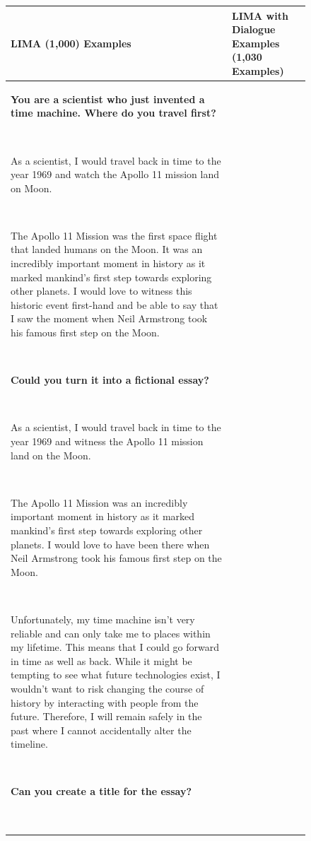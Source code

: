 \documentclass{article}
\begin{document}
 \begin{figure}[p]
    \scriptsize
    \centering
    \begin{tabular}{@{}p{}p{}@{}}
    \toprule
    \textbf{LIMA (1,000) Examples} & \textbf{LIMA with Dialogue Examples (1,030 Examples)} \\
    \midrule
    \textcolor[HTML]{3078BE}{\textbf{You are a scientist who just invented a time machine. Where do you travel first?}}
    
    ~
    
    As a scientist, I would travel back in time to the year 1969 and watch the Apollo 11 mission land on Moon.
    
    ~
    
    The Apollo 11 Mission was the first space flight that landed humans on the Moon. It was an incredibly important moment in history as it marked mankind's first step towards exploring other planets. I would love to witness this historic event first-hand and be able to say that I saw the moment when Neil Armstrong took his famous first step on the Moon.
    
    ~
    
    \textcolor[HTML]{3078BE}{\textbf{Could you turn it into a fictional essay?}}
    
    ~
    
    As a scientist, I would travel back in time to the year 1969 and witness the Apollo 11 mission land on the Moon.
    
    ~
    
    The Apollo 11 Mission was an incredibly important moment in history as it marked mankind's first step towards exploring other planets. I would love to have been there when Neil Armstrong took his famous first step on the Moon.
    
    ~
    
    Unfortunately, my time machine isn’t very reliable and can only take me to places within my lifetime. This means that I could go forward in time as well as back. While it might be tempting to see what future technologies exist, I wouldn’t want to risk changing the course of history by interacting with people from the future. Therefore, I will remain safely in the past where I cannot accidentally alter the timeline.
    
    ~
    
    \textcolor[HTML]{3078BE}{\textbf{Can you create a title for the essay?}}
    
    ~
    

\end{tabular}
\end{figure}
\end{document}
